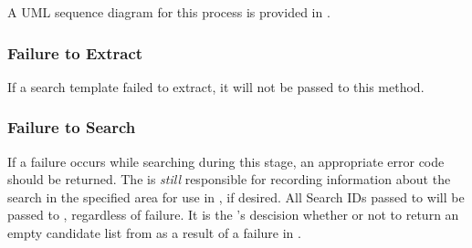 A UML sequence diagram for this process is provided in
.

\subsubsection{Failure to Extract}
If a search template failed to extract, it will not be passed to this method.

\subsubsection{Failure to Search}
If a failure occurs while searching during this stage, an appropriate error
code should be returned. The \implementation is \textit{still} responsible for
recording information about the search in the specified area for use in
\stagetwoidentification, if desired. All Search IDs passed to
\stageoneidentification will be passed to \stagetwoidentification, regardless
of failure. It is the \implementation's descision whether or not to return
an empty candidate list from \stagetwoidentification as a result of a failure
in \stageoneidentification.

